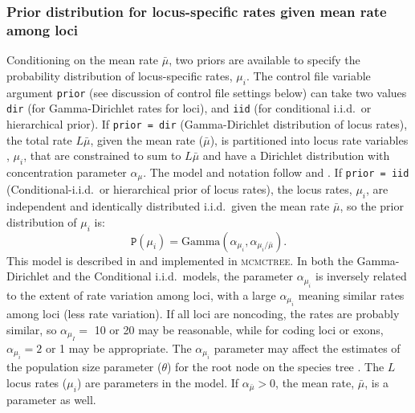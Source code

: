 \documentclass[a4paper]{book}
\numberwithin{equation}{section} \renewcommand{\baselinestretch}{0.55}
\begin{document}
\subsubsection{Prior distribution for locus-specific rates given mean rate among loci}
Conditioning on the mean rate $\bar\mu$, two priors are available to
specify the probability distribution of locus-specific rates, $\mu_i$.
The control file variable argument \texttt{prior} (see discussion of
control file settings below) can take two values \texttt{dir} (for
Gamma-Dirichlet rates for loci), and \texttt{iid} (for conditional
i.i.d.\ or hierarchical prior).  If \texttt{prior = dir}
(Gamma-Dirichlet distribution of locus rates), the total rate
$L\bar\mu$, given the mean rate ($\bar\mu$), is partitioned into locus
rate variables , $\mu_i$, that are constrained to sum to $L\bar\mu$
and have a Dirichlet distribution with concentration parameter
$\alpha_\mu$.  The model and notation follow
\citet[][eq.~4]{Burgess2008} and \citet[][eqs.~3-5]{dosReis2014}.  If
\texttt{prior = iid} (Conditional-i.i.d.\ or hierarchical prior of
locus rates), the locus rates, $\mu_i$, are independent and
identically distributed i.i.d.\ given the mean rate $\bar\mu$, so the
prior distribution of $\mu_i$ is:
\begin{displaymath}
  \mathtt{P}(\mu_i) = \textrm{Gamma}(\alpha_{\mu_i}, \alpha_{\mu_i/\bar{\mu}}).
\end{displaymath}
This model is described in \citet[][eq.~8]{Zhu2015} and implemented in
\textsc{mcmctree}.  In both the Gamma-Dirichlet and the Conditional
i.i.d.\ models, the parameter $\alpha_{\mu_i}$ is inversely related to
the extent of rate variation among loci, with a large $\alpha_{\mu_i}$
meaning similar rates among loci (less rate variation).  If all loci
are noncoding, the rates are probably similar, so $\alpha_{\mu_I} =$
10 or 20 may be reasonable, while for coding loci or exons,
$\alpha_{\mu_i} = 2$ or 1 may be appropriate.  The $\alpha_{\mu_i}$
parameter may affect the estimates of the population size parameter
($\theta$) for the root node on the species tree \citep{Burgess2008}.
The $L$ locus rates ($\mu_i$) are parameters in the model.  If
$\alpha_{\bar{\mu}} > 0$, the mean rate, $\bar\mu$, is a parameter as
well.
\end{document}
